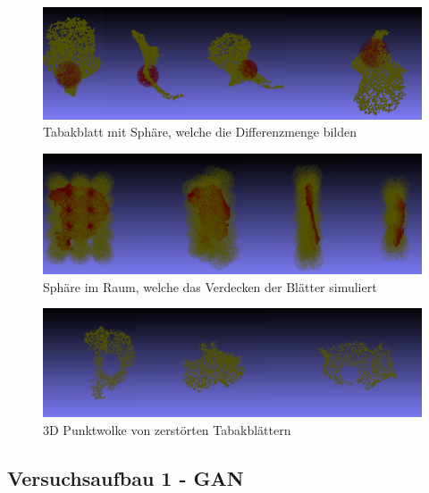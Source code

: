 \documentclass{llncs}
\begin{document}
\begin{figure}[htbp] 
	\centering
	\includegraphics[width=1.0\textwidth]{sphere1.png}
	\caption{Tabakblatt mit Sphäre, welche die Differenzmenge bilden}
	\label{fig:Bild52}
\end{figure}

\begin{figure}[htbp] 
	\centering
	\includegraphics[width=1.0\textwidth]{allsphere.png}
	\caption{Sphäre im Raum, welche das Verdecken der Blätter simuliert}
	\label{fig:Bild53}
\end{figure}

\begin{figure}[htbp] 
	\centering
	\includegraphics[width=1.0\textwidth]{training_destroyed.png}
	\caption{3D Punktwolke von zerstörten Tabakblättern}
	\label{fig:Bild54}
\end{figure}
\newpage


\subsection{Versuchsaufbau 1 - GAN}\label{sec:versuch1-aufbau}
\end{document}
